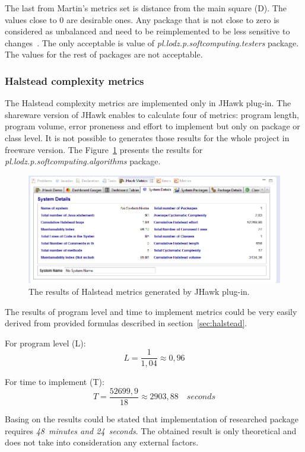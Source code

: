 The last from Martin's metrics set is distance from the main square (\ac{D}). The values close to 0 are desirable ones. Any package that is not close to zero is considered as unbalanced and need to be reimplemented to be less sensitive to changes~\cite{martin}. The only acceptable is value of \textit{pl.lodz.p.soft\-com\-pu\-ting.tes\-ters} package. The values for the rest of packages are not acceptable. 

\subsubsection*{Halstead complexity metrics}
The Halstead complexity metrics are implemented only in JHawk plug-in. The shareware version of JHawk enables to calculate four of metrics: program length, program volume, error proneness and effort to implement but only on package or class level. It is not possible to generates those results for the whole project in freeware version. The Figure~\ref{fig:jhawk3} presents the results for  \textit{pl.lodz.p.soft\-com\-pu\-ting.al\-go\-rithms} package. 

\begin{figure}[h!]
	\centering
	\includegraphics[scale=0.7]{img/jhawk3.png}  
	\caption{The results of Halstead metrics generated by JHawk plug-in.}		
	\label{fig:jhawk3}
\end{figure}

The results of program level and time to implement metrics could be very easily derived from provided formulas described in section~\ref{sec:halstead}. 

For program level (L):
\[L=\frac { 1 }{ 1,04 } \approx 0,96\]

For time to implement (T):
\[T=\frac { 52699,9 }{ 18 } \approx 2903,88\quad seconds\]

Basing on the results could be stated that implementation of researched package requires \textit{48~minutes and 24~seconds}. The obtained result is only theoretical and does not take into consideration any external factors.  


